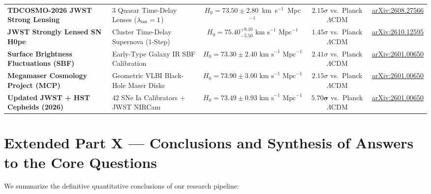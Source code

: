 \documentclass[aps,prd,preprint,superscriptaddress,nofootinbib]{revtex4-2}
\begin{document}
\begin{table}[!htbp]
{\begin{tabular}{llccc}
\midrule
\textbf{TDCOSMO-2026 JWST Strong Lensing} & 3 Quasar Time-Delay Lenses ($\lambda_{\rm int}=1$) & $H_0 = 73.50 \pm 2.80$~km~s$^{-1}$~Mpc$^{-1}$ & $2.15\sigma$ vs.\ Planck $\Lambda$CDM & \href{https://arxiv.org/abs/2608.27566}{arXiv:2608.27566} \\
\textbf{JWST Strongly Lensed SN H0pe} & Cluster Time-Delay Supernova (1-Step) & $H_0 = 75.40^{+8.10}_{-5.50}\text{ km s}^{-1}\text{ Mpc}^{-1}$ & $1.45\sigma$ vs.\ Planck $\Lambda$CDM & \href{https://arxiv.org/html/2610.12595v1}{arXiv:2610.12595} \\
\textbf{Surface Brightness Fluctuations (SBF)} & Early-Type Galaxy IR SBF Calibration & $H_0 = 73.30 \pm 2.40\text{ km s}^{-1}\text{ Mpc}^{-1}$ & $2.41\sigma$ vs.\ Planck $\Lambda$CDM & \href{https://arxiv.org/pdf/2601.00650}{arXiv:2601.00650} \\
\textbf{Megamaser Cosmology Project (MCP)} & Geometric VLBI Black-Hole Maser Disks & $H_0 = 73.90 \pm 3.00\text{ km s}^{-1}\text{ Mpc}^{-1}$ & $2.15\sigma$ vs.\ Planck $\Lambda$CDM & \href{https://arxiv.org/pdf/2601.00650}{arXiv:2601.00650} \\
\textbf{Updated JWST + HST Cepheids (2026)} & 42 SNe Ia Calibrators + JWST NIRCam & $H_0 = 73.49 \pm 0.93\text{ km s}^{-1}\text{ Mpc}^{-1}$ & $\mathbf{5.70}\boldsymbol{\sigma}$ vs.\ Planck $\Lambda$CDM & \href{https://arxiv.org/pdf/2601.00650}{arXiv:2601.00650} \\
\bottomrule
\end{tabular}%
}
\end{table}

\section{Extended Part X --- Conclusions and Synthesis of Answers to the Core Questions}

We summarize the definitive quantitative conclusions of our research pipeline:
\end{document}
